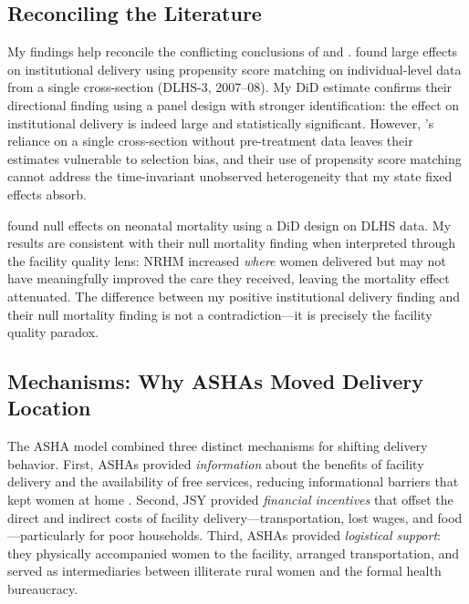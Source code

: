\documentclass[12pt]{article}
\begin{document}
\subsection{Reconciling the Literature}

My findings help reconcile the conflicting conclusions of \citet{lim2010india} and \citet{powell2015did}. \citeauthor{lim2010india} found large effects on institutional delivery using propensity score matching on individual-level data from a single cross-section (DLHS-3, 2007--08). My DiD estimate confirms their directional finding using a panel design with stronger identification: the effect on institutional delivery is indeed large and statistically significant. However, \citeauthor{lim2010india}'s reliance on a single cross-section without pre-treatment data leaves their estimates vulnerable to selection bias, and their use of propensity score matching cannot address the time-invariant unobserved heterogeneity that my state fixed effects absorb.

\citeauthor{powell2015did} found null effects on neonatal mortality using a DiD design on DLHS data. My results are consistent with their null mortality finding when interpreted through the facility quality lens: NRHM increased \emph{where} women delivered but may not have meaningfully improved the care they received, leaving the mortality effect attenuated. The difference between my positive institutional delivery finding and their null mortality finding is not a contradiction---it is precisely the facility quality paradox.

\subsection{Mechanisms: Why ASHAs Moved Delivery Location}

The ASHA model combined three distinct mechanisms for shifting delivery behavior. First, ASHAs provided \emph{information} about the benefits of facility delivery and the availability of free services, reducing informational barriers that kept women at home \citep{rao2016asha}. Second, JSY provided \emph{financial incentives} that offset the direct and indirect costs of facility delivery---transportation, lost wages, and food---particularly for poor households. Third, ASHAs provided \emph{logistical support}: they physically accompanied women to the facility, arranged transportation, and served as intermediaries between illiterate rural women and the formal health bureaucracy.
\end{document}
